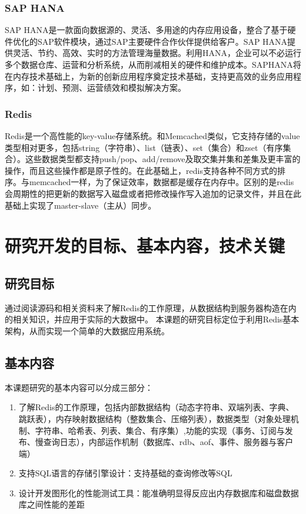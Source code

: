 \documentclass[proposal]{zjutreport}
\begin{document}
\subsection{SAP HANA}
SAP HANA是一款面向数据源的、灵活、多用途的内存应用设备，整合了基于硬件优化的SAP软件模块，通过SAP主要硬件合作伙伴提供给客户。SAP HANA提供灵活、节约、高效、实时的方法管理海量数据。利用HANA，企业可以不必运行多个数据仓库、运营和分析系统，从而削减相关的硬件和维护成本。SAPHANA将在内存技术基础上，为新的创新应用程序奠定技术基础，支持更高效的业务应用程序，如：计划、预测、运营绩效和模拟解决方案。

\subsection{Redis}
Redis是一个高性能的key-value存储系统。和Memcached类似，它支持存储的value类型相对更多，包括string（字符串）、list（链表）、set（集合）和zset（有序集合）。这些数据类型都支持push/pop、add/remove及取交集并集和差集及更丰富的操作，而且这些操作都是原子性的。在此基础上，redis支持各种不同方式的排序。与memcached一样，为了保证效率，数据都是缓存在内存中。区别的是redis会周期性的把更新的数据写入磁盘或者把修改操作写入追加的记录文件，并且在此基础上实现了master-slave（主从）同步。

\chapter{研究开发的目标、基本内容，技术关键}
\section{研究目标}
通过阅读源码和相关资料来了解Redis的工作原理，从数据结构到服务器构造在内的相关知识，并应用于实际的大数据中。
本课题的研究目标定位于利用Redis基本架构，从而实现一个简单的大数据应用系统。

\section{基本内容}
本课题研究的基本内容可以分成三部分：
\begin{enumerate}[label=（\arabic*）]
\item{了解Redis的工作原理，包括内部数据结构（动态字符串、双端列表、字典、跳跃表），内存映射数据结构（整数集合、压缩列表），数据类型（对象处理机制、字符串、哈希表、列表、集合、有序集）,功能的实现（事务、订阅与发布、慢查询日志），内部运作机制（数据库、rdb、aof、事件、服务器与客户端）
}
\item{支持SQL语言的存储引擎设计：支持基础的查询修改等SQL}
\item{设计开发图形化的性能测试工具：能准确明显得反应出内存数据库和磁盘数据库之间性能的差距}
\end{enumerate}
\end{document}
